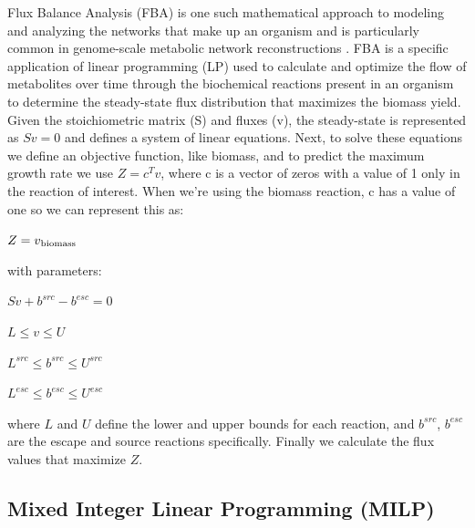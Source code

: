\indent\indent Flux Balance Analysis (FBA) is one such mathematical approach to modeling and analyzing the networks that make up an organism and is particularly common in genome-scale metabolic network reconstructions \citep{schuster_elementary_1994,varma_stoichiometric_1994,thiele_genome-scale_2009}. FBA is a specific application of linear programming (LP) used to calculate and optimize the flow of metabolites over time through the biochemical reactions present in an organism to determine the steady-state flux distribution that maximizes the biomass yield. Given the stoichiometric matrix (S) and fluxes (v), the steady-state is represented as $Sv = 0$ and defines a system of linear equations. Next, to solve these equations we define an objective function, like biomass, and to predict the maximum growth rate we use $Z =c^Tv$, where c is a vector of zeros with a value of 1 only in the reaction of interest. When we're using the biomass reaction, c has a value of one so we can represent this as:\begin{center} $ Z = v\textsubscript{biomass}$\end{center}
with parameters:
\begin{center} 
$Sv + b^{src} - b^{esc} = 0$

$L \leq v \leq U$

$L^{src} \leq b^{src} \leq U^{src}$

$L^{esc} \leq b^{esc} \leq U^{esc}$
\end{center}
where $L$ and $U$ define the lower and upper bounds for each reaction, and $b^{src}$, $b^{esc}$ are the escape and source reactions specifically\citep{brooks_gap_2012}. Finally we calculate the flux values that maximize $Z$.\\

\subsection{Mixed Integer Linear Programming (MILP)}

